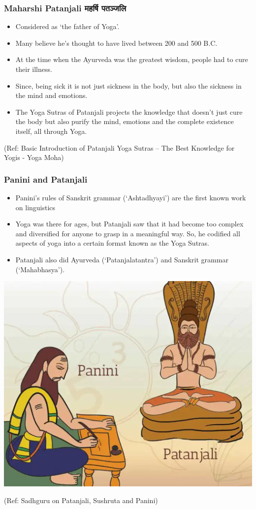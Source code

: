 \begin{frame}[fragile]\frametitle{Maharshi Patanjali महर्षि पतञ्जलि}

	\begin{itemize}
	\item Considered as `the father of Yoga'.
\item Many believe he’s thought to have lived between 200 and 500 B.C. 
\item At the time when the Ayurveda was the greatest wisdom, people had to cure their illness.	
\item Since, being sick it is not just sickness in the body, but also the sickness in the mind and emotions. 
\item The Yoga Sutras of Patanjali projects the knowledge that doesn’t just cure the body but also purify the mind, emotions and the complete existence itself, all through Yoga.
	\end{itemize}

\tiny{(Ref: Basic Introduction of Patanjali Yoga Sutras – The Best Knowledge for Yogis - Yoga Moha)}

\end{frame}

\begin{frame}[fragile]\frametitle{Panini and Patanjali}

	\begin{itemize}
	\item Panini's rules of Sanskrit grammar (`Ashtadhyayi') are the first known work on linguistics
	\item Yoga was there for ages, but Patanjali saw that it had become too complex and diversified for anyone to grasp in a meaningful way. So, he codified all aspects of yoga into a certain format known as the Yoga Sutras. 
	\item Patanjali also did Ayurveda (`Patanjalatantra') and Sanskrit grammar (`Mahabhasya').
	\end{itemize}

\begin{center}
\includegraphics[width=0.5\linewidth,keepaspectratio]{images/patanjalipanini}
\end{center}


\tiny{(Ref: Sadhguru on Patanjali, Sushruta and Panini)}

\end{frame}




